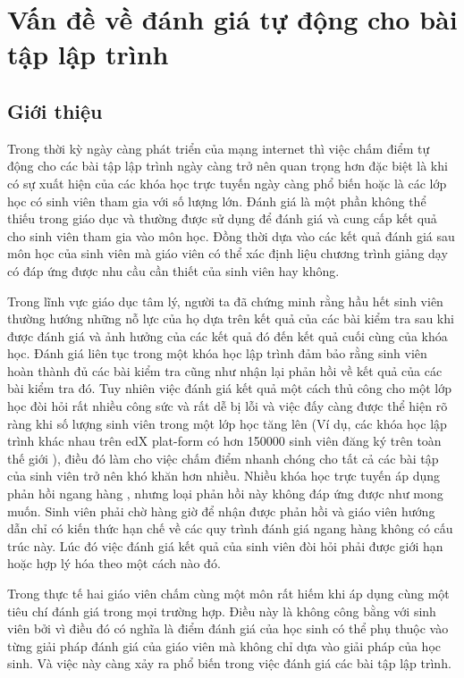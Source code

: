 \documentclass[12pt,a4paper]{article}
\author{Huu Tai}
\begin{document}
\section{Vấn đề về đánh giá tự động cho bài tập lập trình}
\subsection{Giới thiệu}
Trong thời kỳ ngày càng phát triển của mạng internet thì việc chấm điểm tự động cho các bài tập lập trình ngày càng trở nên quan trọng hơn đặc biệt là khi có sự xuất hiện của các khóa học trực tuyến ngày càng phổ biến hoặc là các lớp học có sinh viên tham gia với số lượng lớn. Đánh giá là một phần không thể thiếu trong giáo dục và thường được sử dụng để đánh giá và cung cấp kết quả cho sinh viên tham gia vào môn học. Đồng thời dựa vào các kết quả đánh giá sau môn học của sinh viên mà giáo viên có thể xác định liệu chương trình giảng dạy có đáp ứng được nhu cầu cần thiết của sinh viên hay không.

\indent Trong lĩnh vực giáo dục tâm lý, người ta đã chứng minh rằng hầu hết sinh viên thường hướng những nỗ lực của họ dựa trên kết quả của các bài kiểm tra sau khi được đánh giá và ảnh hưởng của các kết quả đó đến kết quả cuối cùng của khóa học. Đánh giá liên tục trong một khóa học lập trình đảm bảo rằng sinh viên hoàn thành đủ các bài kiểm tra cũng như nhận lại phản hồi về kết quả của các bài kiểm tra đó. Tuy nhiên việc đánh giá kết quả một cách thủ công cho một lớp học đòi hỏi rất nhiều công sức và rất dễ bị lỗi và việc đấy càng được thể hiện rõ ràng khi số lượng sinh viên trong một lớp học tăng lên (Ví dụ, các khóa học lập trình khác nhau trên edX plat-form có hơn 150000 sinh viên đăng ký trên toàn thế giới \cite{liu2019automatic}), điều đó làm cho việc chấm điểm nhanh chóng cho tất cả các bài tập của sinh viên trở nên khó khăn hơn nhiều. Nhiều khóa học trực tuyến áp dụng phản hồi ngang hàng \cite{weld2012personalized}, nhưng loại phản hồi này không đáp ứng được như mong muốn. Sinh viên phải chờ hàng giờ để nhận được phản hồi và giáo viên hướng dẫn chỉ có kiến thức hạn chế về các quy trình đánh giá ngang hàng không có cấu trúc này. Lúc đó việc đánh giá kết quả của sinh viên đòi hỏi phải được giới hạn hoặc hợp lý hóa theo một cách nào đó.

\indent Trong thực tế hai giáo viên chấm cùng một môn rất hiếm khi áp dụng cùng một tiêu chí đánh giá trong mọi trường hợp. Điều này là không công bằng với sinh viên bởi vì điều đó có nghĩa là điểm đánh giá của học sinh có thể phụ thuộc vào từng giải pháp đánh giá của giáo viên mà không chỉ dựa vào giải pháp của học sinh. Và việc này càng xảy ra phổ biến trong việc đánh giá các bài tập lập trình.
\end{document}
